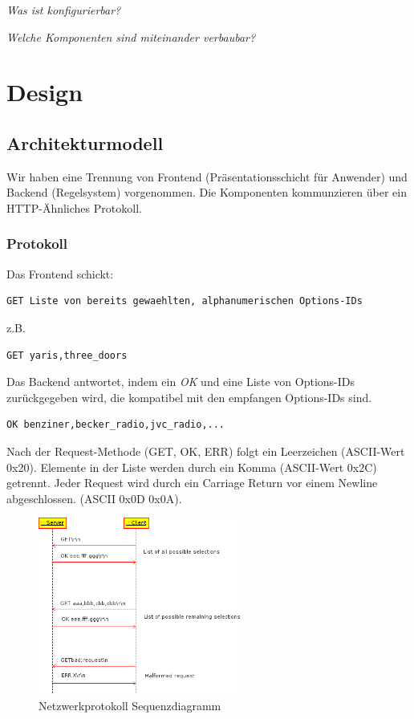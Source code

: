 \documentclass[a4paper,10pt]{article}
\begin{document}
\emph{Was ist konfigurierbar?}

\emph{Welche Komponenten sind miteinander verbaubar?}

\section{Design}

\subsection*{Architekturmodell}

Wir haben eine Trennung von Frontend (Präsentationsschicht für Anwender) und Backend (Regelsystem) vorgenommen.
Die Komponenten kommunzieren über ein HTTP-Ähnliches Protokoll.

\subsubsection{Protokoll}
Das Frontend schickt:

\begin{lstlisting}
GET Liste von bereits gewaehlten, alphanumerischen Options-IDs
\end{lstlisting}

z.B.

\begin{lstlisting}
GET yaris,three_doors
\end{lstlisting}

Das Backend antwortet, indem ein \textit{OK} und eine Liste von Options-IDs zurückgegeben wird, die kompatibel mit den empfangen Options-IDs sind.

\begin{lstlisting}
OK benziner,becker_radio,jvc_radio,...
\end{lstlisting}

Nach der Request-Methode (GET, OK, ERR) folgt ein Leerzeichen (ASCII-Wert 0x20). Elemente in der Liste werden durch ein Komma (ASCII-Wert 0x2C) getrennt.
Jeder Request wird durch ein Carriage Return vor einem Newline abgeschlossen. (ASCII 0x0D 0x0A).

\begin{figure}[htb]
	\centering
	\includegraphics[width=0.6\textwidth]{doc/netsequence.png}
	\caption{Netzwerkprotokoll Sequenzdiagramm}
	\label{fig:networkproto_sequence}
\end{figure}
\end{document}
